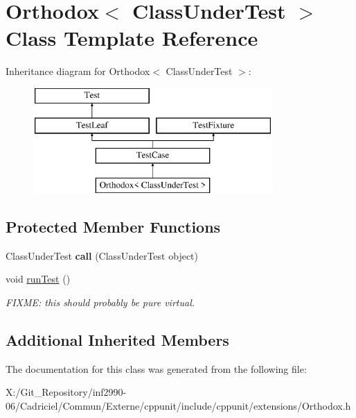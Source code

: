 \hypertarget{class_orthodox}{\section{Orthodox$<$ Class\-Under\-Test $>$ Class Template Reference}
\label{class_orthodox}
}
Inheritance diagram for Orthodox$<$ Class\-Under\-Test $>$\-:\begin{figure}[H]
\begin{center}
\leavevmode
\includegraphics[height=4.000000cm]{class_orthodox}
\end{center}
\end{figure}
\subsection*{Protected Member Functions}
\begin{DoxyCompactItemize}
\item 
\hypertarget{class_orthodox_a08e9feb769578cb7a8b92c7c2c5d1874}{Class\-Under\-Test {\bfseries call} (Class\-Under\-Test object)}\label{class_orthodox_a08e9feb769578cb7a8b92c7c2c5d1874}

\item 
\hypertarget{class_orthodox_aaeaafea272fdce3b5b2f33882cb33d8c}{void \hyperlink{class_orthodox_aaeaafea272fdce3b5b2f33882cb33d8c}{run\-Test} ()}\label{class_orthodox_aaeaafea272fdce3b5b2f33882cb33d8c}

\begin{DoxyCompactList}\small\item\em F\-I\-X\-M\-E\-: this should probably be pure virtual. \end{DoxyCompactList}\end{DoxyCompactItemize}
\subsection*{Additional Inherited Members}


The documentation for this class was generated from the following file\-:\begin{DoxyCompactItemize}
\item 
X\-:/\-Git\-\_\-\-Repository/inf2990-\/06/\-Cadriciel/\-Commun/\-Externe/cppunit/include/cppunit/extensions/Orthodox.\-h\end{DoxyCompactItemize}
